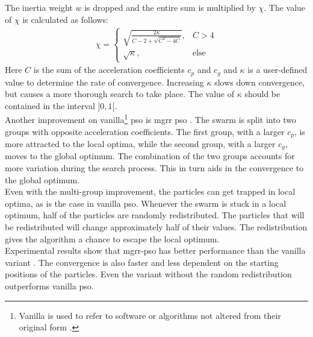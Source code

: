 \newpage
The inertia weight $w$ is dropped and the entire sum is multiplied by $\chi$. The value of $\chi$ is calculated as follows:
\begin{align*}
	\chi = 
	\begin{cases}
		\sqrt{\frac{2\kappa}{C-2+\sqrt{C^2-4C}}}, &C>4\\
		\sqrt{\kappa}, 							&\text{else}
	\end{cases}
\end{align*}
Here $C$ is the sum of the acceleration coefficients $c_p$ and $c_g$ and $\kappa$ is a user-defined value to determine the rate of convergence. Increasing $\kappa$ slows down convergence, but causes a more thorough search to take place. The value of $\kappa$ should be contained in the interval $]0, 1[$.\\ 

Another improvement on vanilla\footnote{Vanilla is used to refer to software or algorithms not altered from their original form \cite{vanilla}.} \gls{pso} is \gls{mgrr} \gls{pso} \cite{opposite_cs}. The swarm is split into two groups with opposite acceleration coefficients. The first group, with a larger $c_p$, is more attracted to the local optima, while the second group, with a larger $c_g$, moves to the global optimum. The combination of the two groups accounts for more variation during the search process. This in turn aids in the convergence to the global optimum.\\ 

Even with the multi-group improvement, the particles can get trapped in local optima, as is the case in vanilla \gls{pso}. Whenever the swarm is stuck in a local optimum, half of the particles are randomly redistributed. The particles that will be redistributed will change approximately half of their values. The redistribution gives the algorithm a chance to escape the local optimum.\\
 
Experimental results show that \gls{mgrr}-\gls{pso} has better performance than the vanilla variant \cite{opposite_cs}. The convergence is also faster and less dependent on the starting positions of the particles. Even the variant without the random redistribution outperforms vanilla \gls{pso}.\\  


